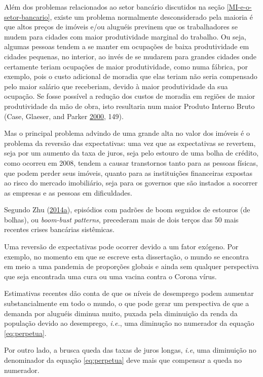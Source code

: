 \documentclass[
	12pt,				%
	oneside,			%
	a4paper,			%
	chapter=TITLE,		%
	section=TITLE,		%
	english,			%
	brazil				%
	]{abntex2}
\begin{document}
Além dos problemas relacionados ao setor bancário discutidos na seção
\ref{MI-e-o-setor-bancario}, existe um problema normalmente desconsiderado pela
maioria é que altos preços de imóveis e/ou aluguéis previnem que os
trabalhadores se mudem para cidades com maior produtividade marginal do
trabalho. Ou seja, algumas pessoas tendem a se manter em ocupações de baixa
produtividade em cidades pequenas, no interior, ao invés de se mudarem para
grandes cidades onde certamente teriam ocupações de maior produtividade, como
numa fábrica, por exemplo, pois o custo adicional de moradia que elas teriam
não seria compensado pelo maior salário que receberiam, devido à maior
produtividade da sua ocupação. Se fosse possível a redução dos custos de moradia
em regiões de maior produtividade da mão de obra, isto resultaria num maior
Produto Interno Bruto (Case, Glaeser, and Parker \protect\hyperlink{ref-Case2000}{2000}, 149).

Mas o principal problema advindo de uma grande alta no valor dos imóveis é o
problema da reversão das expectativas: uma vez que as expectativas se revertem,
seja por um aumento da taxa de juros, seja pelo estouro de uma bolha de crédito,
como ocorreu em 2008, tendem a causar transtornos tanto para as pessoas físicas,
que podem perder seus imóveis, quanto para as instituições financeiras expostas
ao risco do mercado imobiliário, seja para os governos que são instados a
socorrer as empresas e as pessoas em dificuldades.

Segundo Zhu (\protect\hyperlink{ref-fmiera}{2014}\protect\hyperlink{ref-fmiera}{a}), episódios com padrões de boom seguidos de estouros (de bolhas),
ou \emph{boom-bust patterns}, precederam mais de dois terços das 50 mais recentes
crises bancárias sistêmicas.

Uma reversão de expectativas pode ocorrer devido a um fator exógeno. Por exemplo,
no momento em que se escreve esta dissertação, o mundo se encontra em meio a
uma pandemia de proporções globais e ainda sem qualquer perspectiva que seja
encontrada uma cura ou uma vacina contra o Corona vírus.

Estimativas recentes dão conta de que os níveis de desemprego podem aumentar
substancialmente em todo o mundo, o que pode gerar um perspectiva de que a
demanda por aluguéis diminua muito, puxada pela diminuição da renda da
população devido ao desemprego, \emph{i.e.}, uma diminução no numerador da equação
\eqref{eq:perpetua}.

Por outro lado, a brusca queda das taxas de juros longas, \emph{i.e}, uma diminuição
no denominador da equação \eqref{eq:perpetua} deve mais que compensar a queda no
numerador.
\end{document}

